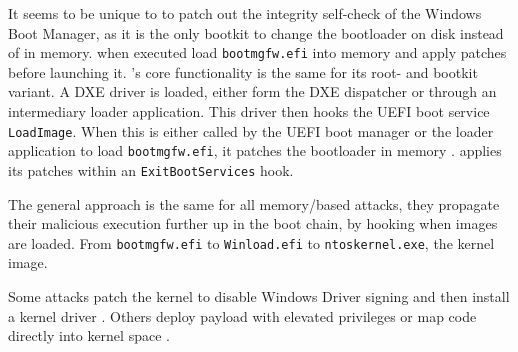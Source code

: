 It seems to be unique to \cite{especter} to patch out the integrity self-check of the Windows Boot Manager, as it is the only bootkit to change the bootloader on disk instead of in memory.
\cite{finspy, dreamboot} when executed load \lstinline{bootmgfw.efi} into memory and apply patches before launching it.
\cite{efiguard}'s core functionality is the same for its root- and bootkit variant.
A \ac{DXE} driver is loaded, either form the \ac{DXE} dispatcher or through an intermediary loader application.
This driver then hooks the \ac{UEFI} boot service \lstinline{LoadImage}. When this is either called by the \ac{UEFI} boot manager or the loader application to load \lstinline{bootmgfw.efi}, it patches the bootloader in memory \cite{efiguard}. \cite{moonbounce} applies its patches within an \lstinline{ExitBootServices} hook.

The general approach is the same for all memory\-/based attacks, they propagate their malicious execution further up in the boot chain, by hooking when images are loaded. From \lstinline{bootmgfw.efi} to \lstinline{Winload.efi} to \lstinline{ntoskernel.exe}, the kernel image.

Some attacks patch the kernel to disable Windows Driver signing and then install a kernel driver \cite{efiguard,especter}.
Others deploy payload with elevated privileges \cite{finspy, dreamboot} or map code directly into kernel space \cite{moonbounce,cosmicstrand}.



